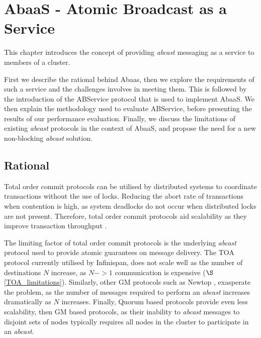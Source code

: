 \chapter{AbaaS - Atomic Broadcast as a Service}

\ifpdf
    \graphicspath{{Chapter3/Figs/Raster/}{Chapter3/Figs/PDF/}{Chapter3/Figs/}}
\else
    \graphicspath{{Chapter3/Figs/Vector/}{Chapter3/Figs/}}
\fi


This chapter introduces the concept of providing \emph{abcast} messaging as a service to members of a cluster.

First we describe the rational behind \textsf{Abaas}, then we explore the requirements of such a service and the challenges involves in meeting them.  This is followed by the introduction of the \textsf{ABService} protocol that is used to implement \textsf{AbaaS}.  We then explain the methodology used to evaluate \textsf{ABService}, before presenting the results of our performance evaluation.  Finally, we discuss the limitations of existing \emph{abcast} protocols in the context of \textsf{AbaaS}, and propose the need for a new non-blocking \emph{abcast} solution.  

\section{Rational}
Total order commit protocols can be utilised by distributed systems to coordinate transactions without the use of locks.  Reducing the abort rate of transactions when contention is high, as system deadlocks do not occur when distributed locks are not present.  Therefore, total order commit protocols aid scalability as they improve transaction throughput \citep{Ruivo:2011:ETO:2120967.2121604}.  

The limiting factor of total order commit protocols is the underlying \emph{abcast} protocol used to provide atomic guarantees on message delivery.  The TOA protocol currently utilised by Infinispan, does not scale well as the number of destinations $N$ increase, as $N->1$ communication is expensive ($\S$ \ref{TOA_limitations}).  Similarly, other GM protocols such as Newtop \citep{Ezhilchelvan:1995:NFG:876885.880005}, exasperate the problem, as the number of messages required to perform an \emph{abcast} increases dramatically as $N$ increases.  Finally, Quorum based protocols provide even less scalability, then GM based protocols, as their inability to \emph{abcast} messages to disjoint sets of nodes typically requires all nodes in the cluster to participate in an \emph{abcast}.  

